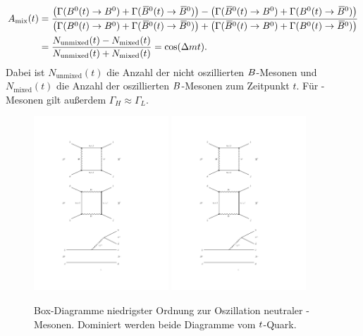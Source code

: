 \begin{equation}
\begin{split}
A_{\text{mix}}(t)&=\frac{\left(\Gamma({{B}^0}(t)\rightarrow{\ensuremath{{B}^0}})+\Gamma({{\kern 0.18em\overline{\kern -0.18em B}{}}{}^0}(t)\rightarrow{\ensuremath{{\kern 0.18em\overline{\kern -0.18em B}{}}{}^0}})\right)-\left(\Gamma({{\kern 0.18em\overline{\kern -0.18em B}{}}{}^0}(t)\rightarrow{\ensuremath{{B}^0}})+\Gamma({{B}^0}(t)\rightarrow{\ensuremath{{\kern 0.18em\overline{\kern -0.18em B}{}}{}^0}})\right)}{\left(\Gamma({{B}^0}(t)\rightarrow{\ensuremath{{B}^0}})+\Gamma({{\kern 0.18em\overline{\kern -0.18em B}{}}{}^0}(t)\rightarrow{\ensuremath{{\kern 0.18em\overline{\kern -0.18em B}{}}{}^0}})\right)+\left(\Gamma({{\kern 0.18em\overline{\kern -0.18em B}{}}{}^0}(t)\rightarrow{\ensuremath{{B}^0}})+\Gamma({{B}^0}(t)\rightarrow{\ensuremath{{\kern 0.18em\overline{\kern -0.18em B}{}}{}^0}})\right)}\\
&=\frac{N_\text{unmixed}(t)-N_\text{mixed}(t)}{N_\text{unmixed}(t)+N_\text{mixed}(t)}=\cos({\Delta m} t).\label{eq:mixing}
\end{split}
\end{equation}
Dabei ist $N_\text{unmixed}(t)$ die Anzahl der nicht oszillierten ${B}$-Mesonen und $N_\text{mixed}(t)$ die Anzahl der oszillierten ${B}$-Mesonen zum Zeitpunkt $t$. Für  \Bz-Mesonen gilt außerdem $\Gamma_H\approx\Gamma_L$.
\begin{figure}[htbp]
	\begin{center}
		\includegraphics[width=0.45\textwidth]{fig/B_mixing_1.pdf}
		\includegraphics[width=0.45\textwidth]{fig/B_mixing_2.pdf}
	\caption{Box-Diagramme niedrigster Ordnung zur Oszillation neutraler \Bz-Mesonen. Dominiert werden beide Diagramme vom ${t}$-Quark.}
	\label{fig:mixing}
 	\end{center}
\end{figure}

